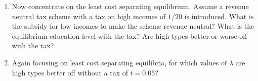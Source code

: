 \documentclass[a4paper,12pt]{article}
\begin{document}
\begin{enumerate}[resume]
\begin{enumerate}
  \item Now concentrate on the least cost separating equilibrium. Assume a revenue neutral tax scheme with a tax on high incomes of $1/20$ is introduced. What is the subsidy for low incomes to make the scheme revenue neutral? What is the equilibrium education level with the tax? Are high types better or worse off with the tax?
  \item Again focusing on least cost separating equilibria, for which values of $\lambda$ are high types better off without a tax of $t=0.05$?
  \end{enumerate}
\end{enumerate}

\newpage


\end{document}
